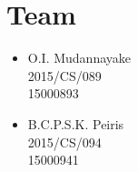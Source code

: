 \section{Team}
    \begin{itemize}
        \item O.I. Mudannayake \\ 2015/CS/089 \\ 15000893
        \item B.C.P.S.K. Peiris \\ 2015/CS/094 \\ 15000941
    \end{itemize}